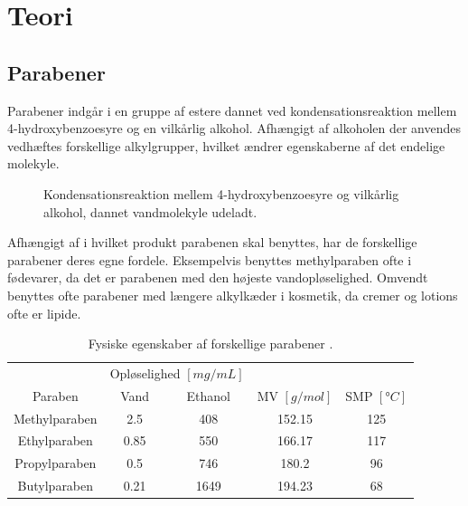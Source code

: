 \section{Teori}
    \subsection{Parabener}
    Parabener indgår i en gruppe af estere dannet ved kondensationsreaktion mellem 4-hydroxybenzoesyre og en vilkårlig alkohol. Afhængigt af alkoholen der anvendes vedhæftes forskellige alkylgrupper, hvilket ændrer egenskaberne af det endelige molekyle.
    \begin{figure}[H]
        \caption{Kondensationsreaktion mellem 4-hydroxybenzoesyre og vilkårlig alkohol, dannet vandmolekyle udeladt.}
    \end{figure}
    Afhængigt af i hvilket produkt parabenen skal benyttes, har de forskellige parabener deres egne fordele. Eksempelvis benyttes methylparaben ofte i fødevarer, da det er parabenen med den højeste vandopløselighed. Omvendt benyttes ofte parabener med længere alkylkæder i kosmetik, da cremer og lotions ofte er lipide.
    \begin{table}[H]\centering
        \caption{Fysiske egenskaber af forskellige parabener \parencite{PubChem}.}
        \begin{tabular}{ccccc}
            \toprule
            & \multicolumn{2}{c}{Opløselighed $\left[\si{mg\per mL}\right]$} & & \\
            \cmidrule(r){2-3}
            Paraben & Vand & Ethanol & MV $\left[\si{g\per mol}\right]$ & SMP $\left[\si{\degree C}\right]$ \\
            \midrule
            Methylparaben & 2.5 & 408 & 152.15 & 125 \\
            Ethylparaben & 0.85 & 550 & 166.17 & 117 \\ 
            Propylparaben & 0.5 & 746 & 180.2 & 96 \\
            Butylparaben & 0.21 & 1649 & 194.23 & 68 \\
            \bottomrule
        \end{tabular}
    \end{table}
